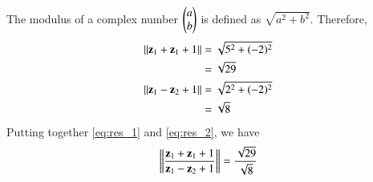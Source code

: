 \documentclass[journal,12pt,twocolumn]{IEEEtran}
\begin{document}
	The modulus of a complex number $\begin{pmatrix}a \\ b\end{pmatrix}$ is defined as $\sqrt{a^{2} + b^{2}}$.
	Therefore, 
	\begin{align}
		\left\lVert\mathbf{z}_1 + \mathbf{z}_1 + 1\right\rVert &= \sqrt{5^{2} + (-2)^{2}} \\ 
		&= \sqrt{29}  \label{eq:res_1} \\
		\left\lVert\mathbf{z}_1 -  \mathbf{z}_2 + 1\right\rVert &= \sqrt{2^{2} + (-2)^{2}} \\ 
		&= \sqrt{8} \label{eq:res_2}
	\end{align}
Putting together \eqref{eq:res_1} and \eqref{eq:res_2}, we have
\begin{align}
		\left\lVert\frac{\mathbf{z}_1 + \mathbf{z}_1 + 1}{\mathbf{z}_1-\mathbf{z}_2+1}\right\rVert	 = \frac{\sqrt{29}}{\sqrt{8}}
\end{align}
\end{document}
